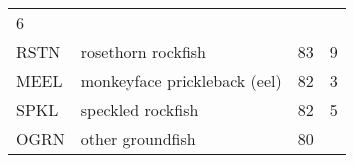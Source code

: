 \documentclass[]{article}
\begin{document}
\begin{longtable}[c]{@{}llll@{}}
\begin{minipage}[t]{0.23\columnwidth}
6
\end{minipage}
\\\addlinespace
\begin{minipage}[t]{0.08\columnwidth}\raggedright
RSTN
\end{minipage} & \begin{minipage}[t]{0.36\columnwidth}\raggedright
rosethorn rockfish
\end{minipage} & \begin{minipage}[t]{0.21\columnwidth}\raggedright
83
\end{minipage} & \begin{minipage}[t]{0.23\columnwidth}\raggedright
9
\end{minipage}
\\\addlinespace
\begin{minipage}[t]{0.08\columnwidth}\raggedright
MEEL
\end{minipage} & \begin{minipage}[t]{0.36\columnwidth}\raggedright
monkeyface prickleback (eel)
\end{minipage} & \begin{minipage}[t]{0.21\columnwidth}\raggedright
82
\end{minipage} & \begin{minipage}[t]{0.23\columnwidth}\raggedright
3
\end{minipage}
\\\addlinespace
\begin{minipage}[t]{0.08\columnwidth}\raggedright
SPKL
\end{minipage} & \begin{minipage}[t]{0.36\columnwidth}\raggedright
speckled rockfish
\end{minipage} & \begin{minipage}[t]{0.21\columnwidth}\raggedright
82
\end{minipage} & \begin{minipage}[t]{0.23\columnwidth}\raggedright
5
\end{minipage}
\\\addlinespace
\begin{minipage}[t]{0.08\columnwidth}\raggedright
OGRN
\end{minipage} & \begin{minipage}[t]{0.36\columnwidth}\raggedright
other groundfish
\end{minipage} & \begin{minipage}[t]{0.21\columnwidth}\raggedright
80
\end{minipage} & \begin{minipage}[t]{0.23\columnwidth}\raggedright

\end{minipage}
\end{longtable}
\end{document}
